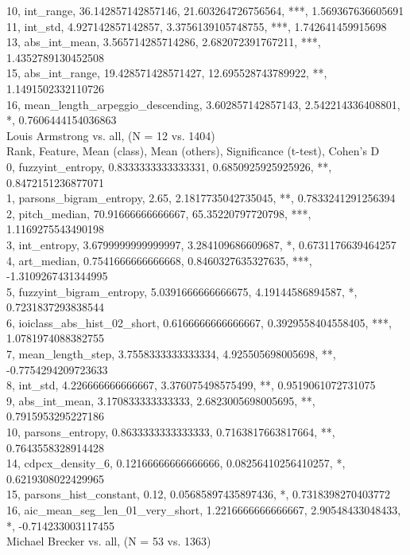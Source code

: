 10, int_range, 36.142857142857146, 21.603264726756564, ***, 1.569367636605691\\
11, int_std, 4.927142857142857, 3.3756139105748755, ***, 1.742641459915698\\
13, abs_int_mean, 3.565714285714286, 2.682072391767211, ***, 1.4352789130452508\\
15, abs_int_range, 19.428571428571427, 12.695528743789922, **, 1.1491502332110726\\
16, mean_length_arpeggio_descending, 3.602857142857143, 2.542214336408801, *, 0.7606444154036863\\
Louis Armstrong vs. all, (N = 12 vs. 1404)\\
Rank, Feature, Mean (class), Mean (others), Significance (t-test), Cohen's D\\
0, fuzzyint_entropy, 0.8333333333333331, 0.6850925925925926, **, 0.8472151236877071\\
1, parsons_bigram_entropy, 2.65, 2.1817735042735045, **, 0.7833241291256394\\
2, pitch_median, 70.91666666666667, 65.35220797720798, ***, 1.1169275543490198\\
3, int_entropy, 3.6799999999999997, 3.284109686609687, *, 0.6731176639464257\\
4, art_median, 0.7541666666666668, 0.8460327635327635, ***, -1.3109267431344995\\
5, fuzzyint_bigram_entropy, 5.0391666666666675, 4.19144586894587, *, 0.7231837293838544\\
6, ioiclass_abs_hist_02_short, 0.6166666666666667, 0.3929558404558405, ***, 1.0781974088382755\\
7, mean_length_step, 3.7558333333333334, 4.925505698005698, **, -0.7754294209723633\\
8, int_std, 4.226666666666667, 3.376075498575499, **, 0.9519061072731075\\
9, abs_int_mean, 3.170833333333333, 2.6823005698005695, **, 0.7915953295227186\\
10, parsons_entropy, 0.8633333333333333, 0.7163817663817664, **, 0.7643558328914428\\
14, cdpcx_density_6, 0.12166666666666666, 0.08256410256410257, *, 0.6219308022429965\\
15, parsons_hist_constant, 0.12, 0.05685897435897436, *, 0.7318398270403772\\
16, aic_mean_seg_len_01_very_short, 1.2216666666666667, 2.90548433048433, *, -0.714233003117455\\
Michael Brecker vs. all, (N = 53 vs. 1363)\\
